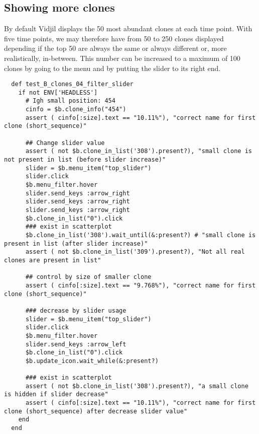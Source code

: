 \subsection{Showing more clones}

By default Vidjil displays the 50 most abundant clones at each time point.
With five time points, we may therefore have from 50 to 250 clones displayed
depending if the top 50 are always the same or always different or, more
realistically, in-between.
This number can be increased to a maximum of 100 clones by going to the  menu and by putting the
slider to its right end.

\begin{verbatim}
  def test_B_clones_04_filter_slider
    if not ENV['HEADLESS']
      # Igh small position: 454
      cinfo = $b.clone_info("454")
      assert ( cinfo[:size].text == "10.11%"), "correct name for first clone (short_sequence)"

      ## Change slider value
      assert ( not $b.clone_in_list('308').present?), "small clone is not present in list (before slider increase)"
      slider = $b.menu_item("top_slider")
      slider.click
      $b.menu_filter.hover
      slider.send_keys :arrow_right 
      slider.send_keys :arrow_right
      slider.send_keys :arrow_right
      $b.clone_in_list("0").click
      ### exist in scatterplot
      $b.clone_in_list('308').wait_until(&:present?) # "small clone is present in list (after slider increase)"
      assert ( not $b.clone_in_list('309').present?), "Not all real clones are present in list"

      ## control by size of smaller clone
      assert ( cinfo[:size].text == "9.768%"), "correct name for first clone (short_sequence)"

      ### decrease by slider usage
      slider = $b.menu_item("top_slider")
      slider.click
      $b.menu_filter.hover
      slider.send_keys :arrow_left 
      $b.clone_in_list("0").click
      $b.update_icon.wait_while(&:present?)

      ### exist in scatterplot
      assert ( not $b.clone_in_list('308').present?), "a small clone is hidden if slider decrease"
      assert ( cinfo[:size].text == "10.11%"), "correct name for first clone (short_sequence) after decrease slider value"
    end
  end
\end{verbatim}

